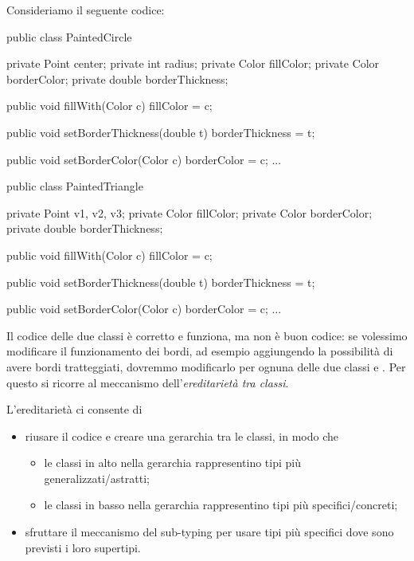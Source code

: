 Consideriamo il seguente codice:
\begin{Java}
    public class PaintedCircle {
        private Point center;
        private int radius;
        private Color fillColor;
        private Color borderColor;
        private double borderThickness;

        public void fillWith(Color c){
            fillColor = c;
        }

        public void setBorderThickness(double t){
            borderThickness = t;
        }

        public void setBorderColor(Color c){
            borderColor = c;
        }
        ...
    }

    public class PaintedTriangle {
        private Point v1, v2, v3;
        private Color fillColor;
        private Color borderColor;
        private double borderThickness;

        public void fillWith(Color c){
            fillColor = c;
        }

        public void setBorderThickness(double t){
            borderThickness = t;
        }

        public void setBorderColor(Color c){
            borderColor = c;
        }
        ...
    }
\end{Java}

Il codice delle due classi è corretto e funziona, ma non è buon codice: se volessimo modificare il funzionamento dei bordi, ad esempio aggiungendo la possibilità di avere bordi tratteggiati, dovremmo modificarlo per ognuna delle due classi  e .
Per questo si ricorre al meccanismo dell'\emph{ereditarietà tra classi}.

L'ereditarietà ci consente di \begin{itemize}
    \item riusare il codice e creare una gerarchia tra le classi, in modo che \begin{itemize}
        \item le classi in alto nella gerarchia rappresentino tipi più generalizzati/astratti;
        \item le classi in basso nella gerarchia rappresentino tipi più specifici/concreti;
    \end{itemize}
    \item sfruttare il meccanismo del sub-typing per usare tipi più specifici dove sono previsti i loro supertipi.
\end{itemize}

